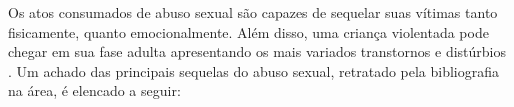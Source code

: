 Os atos consumados de abuso sexual são capazes de sequelar suas vítimas tanto fisicamente, quanto emocionalmente. Além disso, uma criança violentada pode chegar em sua fase adulta apresentando os mais variados transtornos e distúrbios \cite{lima2018violencia}. Um achado das principais sequelas do abuso sexual, retratado pela bibliografia na área, é elencado a seguir:


\begin{parcolumns}{2}
\raggedright
{}
\colplacechunks


\colplacechunks


\colplacechunks


\colplacechunks



\end{parcolumns}
